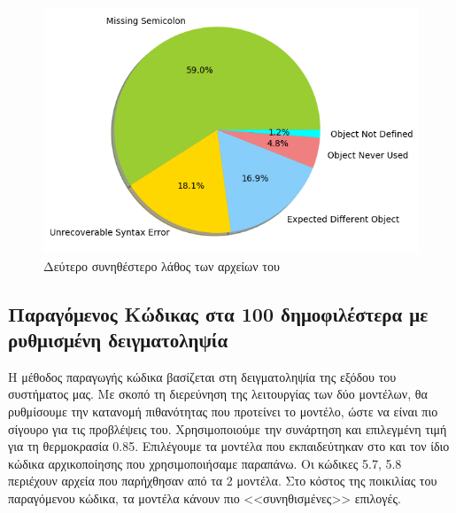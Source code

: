 \begin{figure}
	\includegraphics[width=\textwidth, keepaspectratio]{images/MCE2-npmlabeled.png}
	\caption{Δεύτερο συνηθέστερο λάθος των αρχείων του }
	\label{MCE2-npmlabeled}
\end{figure}

\pagebreak 

\subsection{Παραγόμενος Κώδικας στα 100 δημοφιλέστερα  με ρυθμισμένη δειγματοληψία}

Η μέθοδος παραγωγής κώδικα βασίζεται στη δειγματοληψία της εξόδου του συστήματος μας. Με σκοπό τη διερεύνηση της λειτουργίας των δύο μοντέλων, θα ρυθμίσουμε την κατανομή πιθανότητας που προτείνει το μοντέλο, ώστε να είναι πιο σίγουρο για τις προβλέψεις του. Χρησιμοποιούμε την συνάρτηση  και επιλεγμένη τιμή για τη θερμοκρασία  0.85. Επιλέγουμε τα μοντέλα που εκπαιδεύτηκαν στο  και τον ίδιο κώδικα αρχικοποίησης που χρησιμοποιήσαμε παραπάνω. Οι κώδικες 5.7, 5.8 περιέχουν αρχεία που παρήχθησαν από τα 2 μοντέλα. Στο κόστος της ποικιλίας του παραγόμενου κώδικα, τα μοντέλα κάνουν πιο <<συνηθισμένες>> επιλογές.   



\pagebreak




